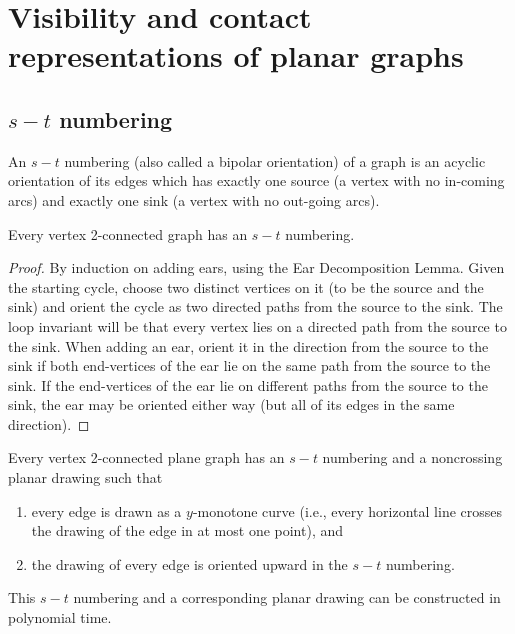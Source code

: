 \chapter{Visibility and contact representations of planar graphs}

\section{$s-t$ numbering}

\begin{defn}
	An $s - t$ numbering (also called a bipolar orientation) of a graph is an acyclic orientation of its edges which has exactly one source (a vertex with no in-coming arcs) and exactly one sink (a vertex with no out-going arcs).
\end{defn}

\begin{prop}
	Every vertex 2-connected graph has an $s - t$ numbering.
\end{prop}

\begin{proof}
	By induction on adding ears, using the Ear Decomposition Lemma. Given the starting cycle, choose two distinct vertices on it (to be the source and the sink) and orient the cycle as two directed paths from the source to the sink. The loop invariant will be that every vertex lies on a directed path from the source to the sink. When adding an ear, orient it in the direction from the source to the sink if both end-vertices of the ear lie on the same path from the source to the sink. If the end-vertices of the ear lie on different paths from the source to the sink, the ear may be oriented either way (but all of its edges in the same direction).
\end{proof}

\begin{thm}
	Every vertex 2-connected plane graph has an $s - t$ numbering and a noncrossing planar drawing such that
	
	\begin{enumerate}[i]
		\item every edge is drawn as a $y$-monotone curve (i.e., every horizontal line crosses the drawing of the edge in at most one point), and
		\item the drawing of every edge is oriented upward in the $s - t$ numbering.
	\end{enumerate}
	\label{thm-1}
\end{thm}

This $s - t$ numbering and a corresponding planar drawing can be constructed in polynomial time.

